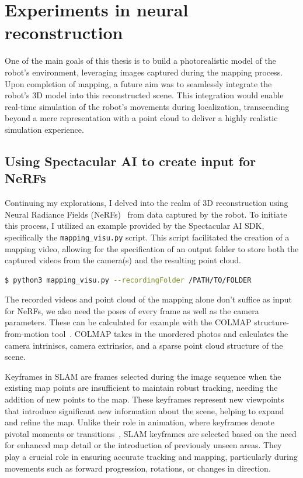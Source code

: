 \chapter{Experiments in neural reconstruction} \label{nerf_gsplat}

One of the main goals of this thesis is to build a photorealistic model of the robot's environment, leveraging images captured during the mapping process. Upon completion of mapping, a future aim was to seamlessly integrate the robot's 3D model into this reconstructed scene. This integration would enable real-time simulation of the robot's movements during localization, transcending beyond a mere representation with a point cloud to deliver a highly realistic simulation experience.


\section{Using Spectacular AI to create input for NeRFs}

Continuing my explorations, I delved into the realm of 3D reconstruction using Neural Radiance Fields (NeRFs)~\cite{nerf} from data captured by the robot. To initiate this process, I utilized an example provided by the Spectacular AI SDK, specifically the \verb|mapping_visu.py| script. This script facilitated the creation of a mapping video, allowing for the specification of an output folder to store both the captured videos from the camera(s) and the resulting point cloud.

\begin{lstlisting}[language=bash,frame=single,float=!ht]
$ python3 mapping_visu.py --recordingFolder /PATH/TO/FOLDER
\end{lstlisting}

The recorded videos and point cloud of the mapping alone don't suffice as input for NeRFs, we also need the poses of every frame as well as the camera parameters. These can be calculated for example with the COLMAP structure-from-motion tool~\cite{colmap}. COLMAP takes in the unordered photos and calculates the camera intriniscs, camera extrinsics, and a sparse point cloud structure of the scene.

Keyframes in SLAM are frames selected during the image sequence when the existing map points are insufficient to maintain robust tracking, needing the addition of new points to the map. These keyframes represent new viewpoints that introduce significant new information about the scene, helping to expand and refine the map. Unlike their role in animation, where keyframes denote pivotal moments or transitions~\cite{keyframes_in_animation}, SLAM keyframes are selected based on the need for enhanced map detail or the introduction of previously unseen areas. They play a crucial role in ensuring accurate tracking and mapping, particularly during movements such as forward progression, rotations, or changes in direction.

